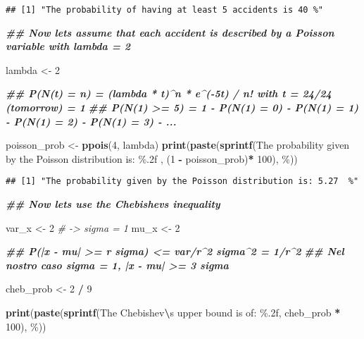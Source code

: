 \documentclass[
]{article}
\newenvironment{Shaded}{\begin{snugshade}}{\end{snugshade}}
\newcommand{\CommentTok}[1]{\textcolor[rgb]{0.56,0.35,0.01}{\textit{#1}}}
\newcommand{\DecValTok}[1]{\textcolor[rgb]{0.00,0.00,0.81}{#1}}
\newcommand{\DocumentationTok}[1]{\textcolor[rgb]{0.56,0.35,0.01}{\textbf{\textit{#1}}}}
\newcommand{\FunctionTok}[1]{\textcolor[rgb]{0.13,0.29,0.53}{\textbf{#1}}}
\newcommand{\NormalTok}[1]{#1}
\newcommand{\OtherTok}[1]{\textcolor[rgb]{0.56,0.35,0.01}{#1}}
\newcommand{\SpecialCharTok}[1]{\textcolor[rgb]{0.81,0.36,0.00}{\textbf{#1}}}
\newcommand{\StringTok}[1]{\textcolor[rgb]{0.31,0.60,0.02}{#1}}
\begin{document}
\begin{verbatim}
## [1] "The probability of having at least 5 accidents is 40 %"
\end{verbatim}

\begin{Shaded}
\begin{Highlighting}[]
\DocumentationTok{\#\# Now let\textquotesingle{}s assume that each accident is described by a Poisson variable with lambda = 2}

\NormalTok{lambda }\OtherTok{\textless{}{-}} \DecValTok{2}

\DocumentationTok{\#\# P(N(t) = n) = (lambda * t)\^{}n * e\^{}({-}5t) / n! with t = 24/24 (tomorrow) = 1}
\DocumentationTok{\#\# P(N(1) \textgreater{}= 5) = 1 {-} P(N(1) = 0) {-} P(N(1) = 1) {-} P(N(1) = 2) {-} P(N(1) = 3) {-} ...}

\NormalTok{poisson\_prob }\OtherTok{\textless{}{-}} \FunctionTok{ppois}\NormalTok{(}\DecValTok{4}\NormalTok{, lambda)}
\FunctionTok{print}\NormalTok{(}\FunctionTok{paste}\NormalTok{(}\FunctionTok{sprintf}\NormalTok{(}\StringTok{\textquotesingle{}The probability given by the Poisson distribution is: \%.2f \textquotesingle{}}\NormalTok{, (}\DecValTok{1} \SpecialCharTok{{-}}\NormalTok{ poisson\_prob)}\SpecialCharTok{*} \DecValTok{100}\NormalTok{), }\StringTok{\textquotesingle{}\%\textquotesingle{}}\NormalTok{))}
\end{Highlighting}
\end{Shaded}

\begin{verbatim}
## [1] "The probability given by the Poisson distribution is: 5.27  %"
\end{verbatim}

\begin{Shaded}
\begin{Highlighting}[]
\DocumentationTok{\#\# Now let\textquotesingle{}s use the Chebishev\textquotesingle{}s inequality }

\NormalTok{var\_x }\OtherTok{\textless{}{-}} \DecValTok{2} \CommentTok{\# {-}\textgreater{} sigma = 1}
\NormalTok{mu\_x }\OtherTok{\textless{}{-}} \DecValTok{2}

\DocumentationTok{\#\# P(|x {-} mu| \textgreater{}= r sigma) \textless{}= var/r\^{}2 sigma\^{}2 = 1/r\^{}2}
\DocumentationTok{\#\# Nel nostro caso sigma = 1, |x {-} mu| \textgreater{}= 3 sigma }

\NormalTok{cheb\_prob }\OtherTok{\textless{}{-}} \DecValTok{2} \SpecialCharTok{/} \DecValTok{9}

\FunctionTok{print}\NormalTok{(}\FunctionTok{paste}\NormalTok{(}\FunctionTok{sprintf}\NormalTok{(}\StringTok{\textquotesingle{}The Chebishev}\SpecialCharTok{\textbackslash{}\textquotesingle{}}\StringTok{s upper bound is of: \%.2f\textquotesingle{}}\NormalTok{, cheb\_prob }\SpecialCharTok{*} \DecValTok{100}\NormalTok{), }\StringTok{\textquotesingle{}\%\textquotesingle{}}\NormalTok{))}
\end{Highlighting}
\end{Shaded}
\end{document}

